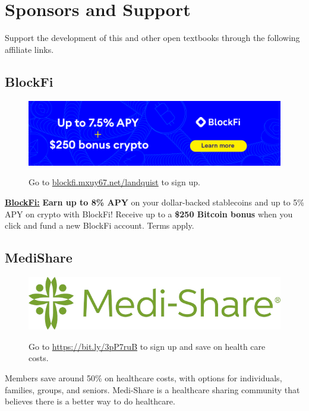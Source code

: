 \chapter*{Sponsors and Support}

Support the development of this and other open textbooks through the following affiliate links.

\section*{BlockFi}
\begin{figure}[!ht]
    \centering
    \href{https://blockfi.mxuy67.net/c/2612759/907789/10568}{\includegraphics[width=\textwidth]{img/support/blockFi/blockfi-banner3.png}}
    \caption{Go to \href{https://blockfi.mxuy67.net/c/2612759/907789/10568}{blockfi.mxuy67.net/landquist} to sign up.}
\end{figure}

\noindent \href{https://blockfi.mxuy67.net/c/2612759/907789/10568}{{\bf BlockFi:}} {\bf Earn up to 8\% APY} on your dollar-backed stablecoins and up to 5\% APY on crypto with BlockFi! Receive up to a {\bf \$250 Bitcoin bonus} when you click and fund a new BlockFi account. Terms apply.

\section*{MediShare}
\begin{figure}[!ht]
    \centering
    \href{https://bit.ly/3pP7ruB}{\includegraphics[width=\textwidth]{img/support/medishare/Medi-ShareLogo.jpg}}
    \caption{Go to \href{https://bit.ly/3pP7ruB}{https://bit.ly/3pP7ruB} to sign up and save on health care costs.}
\end{figure}
\noindent Members save around 50\% on healthcare costs, with options for individuals, families, groups, and seniors. Medi-Share is a healthcare sharing community that believes there is a better way to do healthcare.

